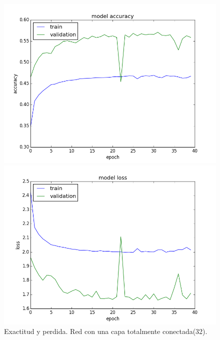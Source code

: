 \documentclass{article}[12pt, a4paper]
\begin{document}
\begin{figure}[h!]
	\begin{minipage}[h]{0.49\textwidth}
		\includegraphics[width=\textwidth]{ej3clessacc}
	\end{minipage}
	\begin{minipage}[h]{0.49\textwidth}
		\includegraphics[width=\textwidth]{ej3clessloss}
	\end{minipage}
	\caption{Exactitud y perdida. Red con una capa totalmente conectada(32).}
	\label{ej3c1}
\end{figure}
	
\end{document}
